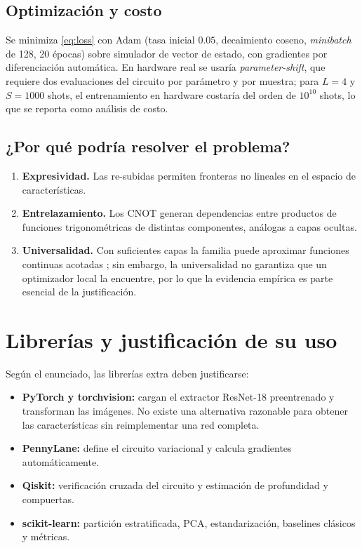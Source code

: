 \documentclass[11pt,letterpaper]{article}
\begin{document}
\subsection{Optimización y costo}
Se minimiza \eqref{eq:loss} con Adam (tasa inicial $0.05$, decaimiento coseno, \emph{minibatch} de
128, 20 épocas) sobre simulador de vector de estado, con gradientes por diferenciación automática.
En hardware real se usaría \emph{parameter-shift}, que requiere dos evaluaciones del circuito por
parámetro y por muestra; para $L=4$ y $S=1000$ shots, el entrenamiento en hardware costaría del
orden de $10^{10}$ shots, lo que se reporta como análisis de costo.

\subsection{¿Por qué podría resolver el problema?}
\begin{enumerate}[leftmargin=*]
\item \textbf{Expresividad.} Las re-subidas permiten fronteras no lineales en el espacio de
características.
\item \textbf{Entrelazamiento.} Los CNOT generan dependencias entre productos de funciones
trigonométricas de distintas componentes, análogas a capas ocultas.
\item \textbf{Universalidad.} Con suficientes capas la familia puede aproximar funciones continuas
acotadas \cite{perez2020}; sin embargo, la universalidad no garantiza que un optimizador local la
encuentre, por lo que la evidencia empírica es parte esencial de la justificación.
\end{enumerate}

\section{Librerías y justificación de su uso}
Según el enunciado, las librerías extra deben justificarse:
\begin{itemize}[leftmargin=*]
\item \textbf{PyTorch y torchvision:} cargan el extractor ResNet-18 preentrenado y transforman las
imágenes. No existe una alternativa razonable para obtener las características sin reimplementar
una red completa.
\item \textbf{PennyLane:} define el circuito variacional y calcula gradientes automáticamente.
\item \textbf{Qiskit:} verificación cruzada del circuito y estimación de profundidad y compuertas.
\item \textbf{scikit-learn:} partición estratificada, PCA, estandarización, baselines clásicos y
métricas.
\end{itemize}
\end{document}
